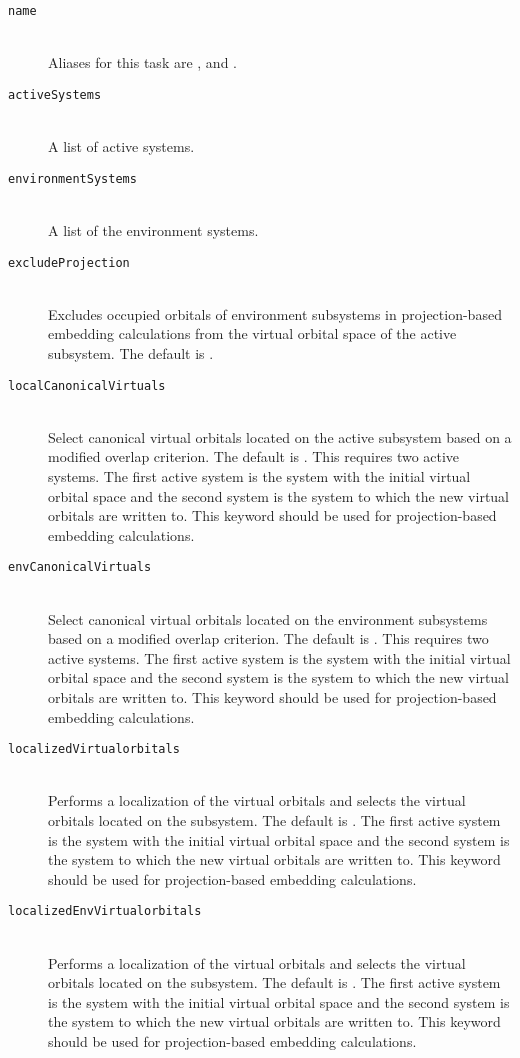 \begin{description}
	\item[\texttt{name}]\hfill \\
    Aliases for this task are ,  and .
	\item[\texttt{activeSystems}]\hfill \\
	A list of active systems.
	\item[\texttt{environmentSystems}]\hfill \\
	A list of the environment systems.
  \item[\texttt{excludeProjection}]\hfill\\
  Excludes occupied orbitals of environment subsystems in projection-based embedding calculations from the virtual orbital space of the active subsystem. The default is . 
  \item[\texttt{localCanonicalVirtuals}]\hfill\\
  Select canonical virtual orbitals located on the active subsystem based on a modified overlap criterion. The default is . This requires two active systems. The first active system is the system with the initial virtual orbital space and the second system is the system to which the new virtual orbitals are written to. This keyword should be used for projection-based embedding calculations.
  \item[\texttt{envCanonicalVirtuals}]\hfill\\
  Select canonical virtual orbitals located on the environment subsystems based on a modified overlap criterion. The default is . This requires two active systems. The first active system is the system with the initial virtual orbital space and the second system is the system to which the new virtual orbitals are written to. This keyword should be used for projection-based embedding calculations.
  \item[\texttt{localizedVirtualorbitals}]\hfill\\
  Performs a localization of the virtual orbitals and selects the virtual orbitals located on the subsystem. The default is . The first active system is the system with the initial virtual orbital space and the second system is the system to which the new virtual orbitals are written to. This keyword should be used for projection-based embedding calculations.
  \item[\texttt{localizedEnvVirtualorbitals}]\hfill\\
  Performs a localization of the virtual orbitals and selects the virtual orbitals located on the subsystem. The default is . The first active system is the system with the initial virtual orbital space and the second system is the system to which the new virtual orbitals are written to. This keyword should be used for projection-based embedding calculations.
\end{description}
